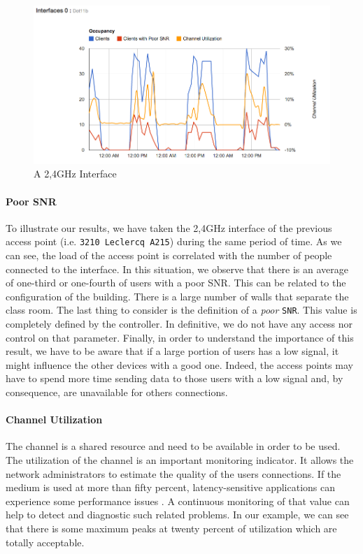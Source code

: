 \begin{figure}[H]
   \includegraphics[width=\textwidth]{Pictures/chapter5/interfaceLoad.png}
   \caption{A 2,4GHz Interface}
\end{figure}

\paragraph*{Poor SNR} To illustrate our results, we have taken the 2,4GHz interface of the previous access point (i.e. \texttt{3210 Leclercq A215}) during the same period of time. As we can see, the load of the access point is correlated with the number of people connected to the interface. In this situation, we observe that there is an average of one-third or one-fourth of users with a poor SNR. This can be related to the configuration of the building. There is a large number of walls that separate the class room. The last thing to consider is the definition of a \emph{poor} \texttt{SNR}. This value is completely defined by the controller. In definitive, we do not have any access nor control on that parameter. Finally, in order to understand the importance of this result, we have to be aware that if a large portion of users has a low signal, it might influence the other devices with a good one. Indeed, the access points may have to spend more time sending data to those users with a low signal and, by consequence, are unavailable for others connections.

\paragraph*{Channel Utilization} The channel is a shared resource and need to be available in order to be used. The utilization of the channel is an important monitoring indicator. It allows the network administrators to estimate the quality of the users connections. If the medium is used at more than fifty percent, latency-sensitive applications can experience some performance issues \cite{ciscoVowlan}. A continuous monitoring of that value can help to detect and diagnostic such related problems. In our example, we can see that there is some maximum peaks at twenty percent of utilization which are totally acceptable. 


